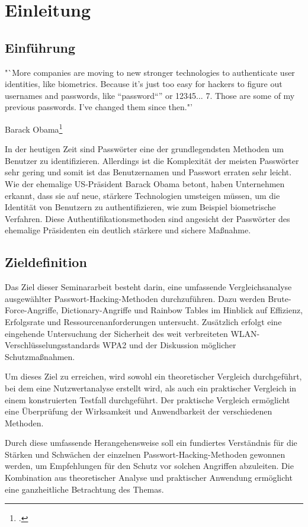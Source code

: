 \section{Einleitung}
\subsection{Einführung}
\epigraph{"`More companies are moving to new stronger technologies to authenticate user identities, like biometrics. Because it's just too easy for hackers to figure out usernames and passwords, like ``password``'' or 12345... 7. Those are some of my previous passwords. I've changed them since then."'}{Barack Obama\footcite[Vgl.]{CNET}}
In der heutigen Zeit sind Passwörter eine der grundlegendsten Methoden um Benutzer zu identifizieren. 
Allerdings ist die Komplexität der meisten Passwörter sehr gering und somit ist das Benutzernamen und Passwort erraten sehr leicht. 
Wie der ehemalige US-Präsident Barack Obama betont, haben Unternehmen erkannt, dass sie auf neue, stärkere Technologien umsteigen müssen, 
um die Identität von Benutzern zu authentifizieren, wie zum Beispiel biometrische Verfahren. 
Diese Authentifikationsmethoden sind angesicht der Passwörter des ehemalige Präsidenten ein deutlich stärkere und sichere Maßnahme.

\subsection{Zieldefinition}
Das Ziel dieser Seminararbeit besteht darin, eine umfassende Vergleichsanalyse ausgewählter Passwort-Hacking-Methoden durchzuführen. Dazu werden Brute-Force-Angriffe, Dictionary-Angriffe und Rainbow Tables im Hinblick auf Effizienz, Erfolgsrate und Ressourcenanforderungen untersucht. Zusätzlich erfolgt eine eingehende Untersuchung der Sicherheit des weit verbreiteten WLAN-Verschlüsselungsstandards WPA2 und der Diskussion möglicher Schutzmaßnahmen.

Um dieses Ziel zu erreichen, wird sowohl ein theoretischer Vergleich durchgeführt, bei dem eine Nutzwertanalyse erstellt wird, als auch ein praktischer Vergleich in einem konstruierten Testfall durchgeführt. Der praktische Vergleich ermöglicht eine Überprüfung der Wirksamkeit und Anwendbarkeit der verschiedenen Methoden.

Durch diese umfassende Herangehensweise soll ein fundiertes Verständnis für die Stärken und Schwächen der einzelnen Passwort-Hacking-Methoden gewonnen werden, 
um Empfehlungen für den Schutz vor solchen Angriffen abzuleiten. Die Kombination aus theoretischer Analyse und praktischer Anwendung ermöglicht eine ganzheitliche Betrachtung des Themas.
